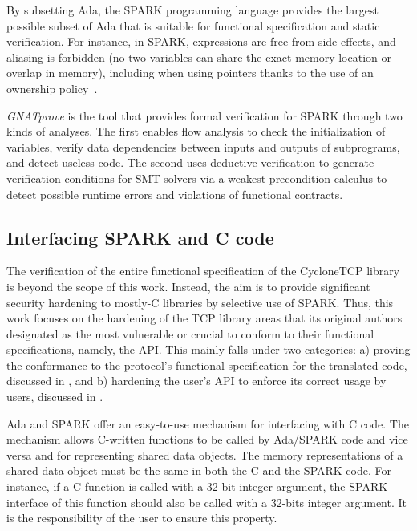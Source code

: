 \documentclass[conference]{IEEEtran}
\begin{document}
By subsetting Ada, the SPARK programming language \cite{mccormick_chapin_2015} provides the largest possible subset of Ada that is suitable for functional specification and static verification. For instance, in SPARK, expressions are free from side effects, and aliasing is forbidden (no two variables can share the exact memory location or overlap in memory), including when using pointers thanks to the use of an ownership policy~\cite{dross2020recursive}.

\emph{GNATprove} \cite{GNATProve:users_manual} is the tool that provides formal verification for SPARK through two kinds of analyses. The first enables flow analysis to check the initialization of variables, verify data dependencies between inputs and outputs of subprograms, and detect useless code. The second uses deductive verification to generate verification conditions for SMT solvers via a weakest-precondition calculus to detect possible runtime errors and violations of functional contracts.



\subsection{Interfacing SPARK and C code}

The verification of the entire functional specification of the CycloneTCP library is beyond the scope of this work. Instead, the aim is to provide significant security hardening to mostly-C libraries by selective use of SPARK. Thus, this work focuses on the hardening of the TCP library areas that its original authors designated as the most vulnerable or crucial to conform to their functional specifications, namely, the API. This mainly falls under two categories: a) proving the conformance to the protocol's functional specification for the translated code, discussed in , and b) hardening the user's API to enforce its correct usage by users, discussed in .

Ada and SPARK offer an easy-to-use mechanism for interfacing with C code. The mechanism allows C-written functions to be called by Ada/SPARK code and vice versa and for representing shared data objects. The memory representations of a shared data object must be the same in both the C and the SPARK code. For instance, if a C function is called with a 32-bit integer argument, the SPARK interface of this function should also be called with a 32-bits integer argument. It is the responsibility of the user to ensure this property.
\end{document}
